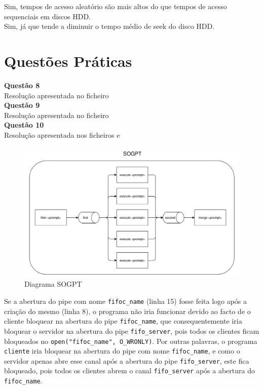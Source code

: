 \documentclass[a4paper, 11pt]{article}
\begin{document}
\noindent {} Sim, tempos de acesso aleatório são mais altos do que tempos de acesso sequenciais em discos HDD.\\

\noindent {} Sim, já que tende a diminuir o tempo médio de seek do disco HDD.

\newpage

\section*{Questões Práticas}

\noindent \textbf{Questão 8}\\

\noindent Resolução apresentada no ficheiro \\


\noindent \textbf{Questão 9}\\

\noindent Resolução apresentada no ficheiro \\


\noindent \textbf{Questão 10}\\

\noindent Resolução apresentada nos ficheiros  e 

\begin{figure}[h]
    \centering
    \includegraphics[width=1\linewidth]{questao-10-diagrama.png}
    \caption{Diagrama SOGPT}
\end{figure}

\noindent Se a abertura do pipe com nome \texttt{fifoc\_name} (linha 15) fosse feita logo após a criação do mesmo (linha 8), o programa não iria funcionar devido ao facto de o cliente bloquear na abertura do pipe \texttt{fifoc\_name}, que consequentemente iria bloquear o servidor na abertura do pipe \texttt{fifo\_server}, pois todos os clientes ficam bloqueados no \texttt{open("fifoc\_name", O\_WRONLY)}. Por outras palavras, o programa \texttt{cliente} iria bloquear na abertura do pipe com nome \texttt{fifoc\_name}, e como o servidor apenas abre esse canal após a abertura do pipe \texttt{fifo\_server}, este fica bloqueado, pois todos os clientes abrem o canal \texttt{fifo\_server} após a abertura do \texttt{fifoc\_name}.\\
\end{document}
